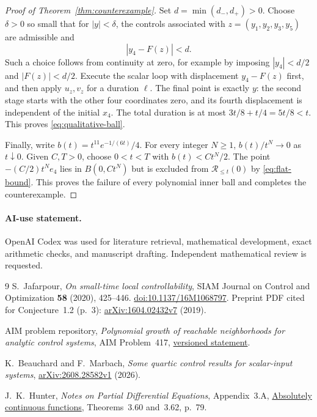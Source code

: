 \documentclass[11pt,a4paper]{article}
\newcommand{\Reach}{\mathcal{R}}
\begin{document}
\begin{proof}[Proof of Theorem~\ref{thm:counterexample}]
Set $d=\min(d_-,d_+)>0$. Choose $\delta>0$ so small that for
$|y|<\delta$, the controls associated with
$z=(y_1,y_2,y_3,y_5)$ are admissible and
\[
 |y_4-F(z)|<d.
\]
Such a choice follows from continuity at zero, for example by imposing
$|y_4|<d/2$ and $|F(z)|<d/2$.
Execute the scalar loop with displacement $y_4-F(z)$ first, and then
apply $u_z,v_z$ for a duration $\ell$.
The final point is exactly $y$: the second stage starts with the other
four coordinates zero, and its fourth displacement is independent of the
initial $x_4$. The total duration is at most
$3t/8+t/4=5t/8<t$. This proves \eqref{eq:qualitative-ball}.

Finally, write $b(t)=t^{11}e^{-1/(6t)}/4$. For every integer $N\ge1$,
$b(t)/t^N\to0$ as $t\downarrow0$.
Given $C,T>0$, choose $0<t<T$ with $b(t)<Ct^N/2$.
The point $-(C/2)t^N e_4$ lies in $B(0,Ct^N)$ but is excluded from
$\Reach_{\le t}(0)$ by \eqref{eq:flat-bound}.
This proves the failure of every polynomial inner ball and completes the
counterexample.
\end{proof}

\paragraph{AI-use statement.}
OpenAI Codex was used for literature retrieval, mathematical development,
exact arithmetic checks, and manuscript drafting. Independent mathematical
review is requested.

\begin{thebibliography}{9}
S.~Jafarpour,
\emph{On small-time local controllability},
SIAM Journal on Control and Optimization \textbf{58} (2020), 425--446.
\href{https://doi.org/10.1137/16M1068797}{doi:10.1137/16M1068797}.
Preprint PDF cited for Conjecture~1.2 (p.~3):
\href{https://arxiv.org/abs/1604.02432v7}{arXiv:1604.02432v7} (2019).

AIM problem repository,
\emph{Polynomial growth of reachable neighborhoods for analytic control systems},
AIM Problem~417,
\href{https://github.com/MColbrook/AIM/blob/c9929805cece044705abaaebe1cebddac1ba11a6/problems/417-analytic-reachable-set-polynomial-growth.md}{versioned statement}.

K.~Beauchard and F.~Marbach,
\emph{Some quartic control results for scalar-input systems},
\href{https://arxiv.org/abs/2608.28582v1}{arXiv:2608.28582v1} (2026).

J.~K.~Hunter,
\emph{Notes on Partial Differential Equations}, Appendix~3.A,
\href{https://www.math.ucdavis.edu/~hunter/pdes/ch3A.pdf}{Absolutely continuous functions},
Theorems~3.60 and~3.62, p.~79.
\end{thebibliography}
\end{document}
